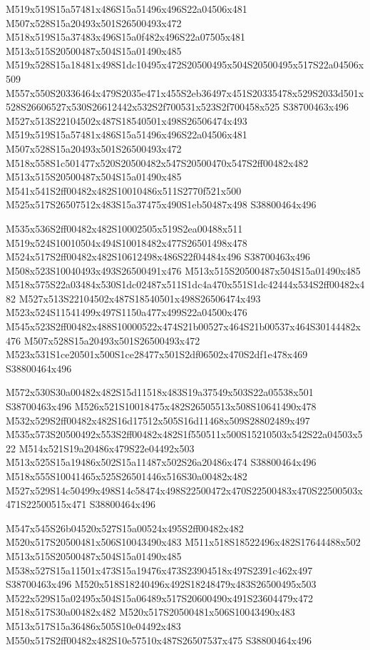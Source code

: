 \documentclass{article}
\begin{document}
\begin{multicols}{2}
M519x519S15a57481x486S15a51496x496S22a04506x481 M507x528S15a20493x501S26500493x472 M518x519S15a37483x496S15a0f482x496S22a07505x481 M513x515S20500487x504S15a01490x485 M519x528S15a18481x498S1dc10495x472S20500495x504S20500495x517S22a04506x509 M557x550S20336464x479S2035e471x455S2eb36497x451S20335478x529S2033d501x528S26606527x530S26612442x532S2f700531x523S2f700458x525 S38700463x496 M527x513S22104502x487S18540501x498S26506474x493 M519x519S15a57481x486S15a51496x496S22a04506x481 M507x528S15a20493x501S26500493x472 M518x558S1c501477x520S20500482x547S20500470x547S2ff00482x482 M513x515S20500487x504S15a01490x485 M541x541S2ff00482x482S10010486x511S2770f521x500 M525x517S26507512x483S15a37475x490S1eb50487x498 S38800464x496

M535x536S2ff00482x482S10002505x519S2ea00488x511 M519x524S10010504x494S10018482x477S26501498x478 M524x517S2ff00482x482S10612498x486S22f04484x496 S38700463x496 M508x523S10040493x493S26500491x476 M513x515S20500487x504S15a01490x485 M518x575S22a03484x530S1dc02487x511S1dc4a470x551S1dc42444x534S2ff00482x482 M527x513S22104502x487S18540501x498S26506474x493 M523x524S11541499x497S1150a477x499S22a04500x476 M545x523S2ff00482x488S10000522x474S21b00527x464S21b00537x464S30144482x476 M507x528S15a20493x501S26500493x472 M523x531S1ce20501x500S1ce28477x501S2df06502x470S2df1e478x469 S38800464x496

M572x530S30a00482x482S15d11518x483S19a37549x503S22a05538x501 S38700463x496 M526x521S10018475x482S26505513x508S10641490x478 M532x529S2ff00482x482S16d17512x505S16d11468x509S28802489x497 M535x573S20500492x553S2ff00482x482S1f550511x500S15210503x542S22a04503x522 M514x521S19a20486x479S22e04492x503 M513x525S15a19486x502S15a11487x502S26a20486x474 S38800464x496 M518x555S10041465x525S26501446x516S30a00482x482 M527x529S14c50499x498S14c58474x498S22500472x470S22500483x470S22500503x471S22500515x471 S38800464x496


M547x545S26b04520x527S15a00524x495S2ff00482x482 M520x517S20500481x506S10043490x483 M511x518S18522496x482S17644488x502 M513x515S20500487x504S15a01490x485 M538x527S15a11501x473S15a19476x473S23904518x497S2391c462x497 S38700463x496 M520x518S18240496x492S18248479x483S26500495x503 M522x529S15a02495x504S15a06489x517S20600490x491S23604479x472 M518x517S30a00482x482 M520x517S20500481x506S10043490x483 M513x517S15a36486x505S10e04492x483 M550x517S2ff00482x482S10e57510x487S26507537x475 S38800464x496


\end{multicols}
\end{document}
